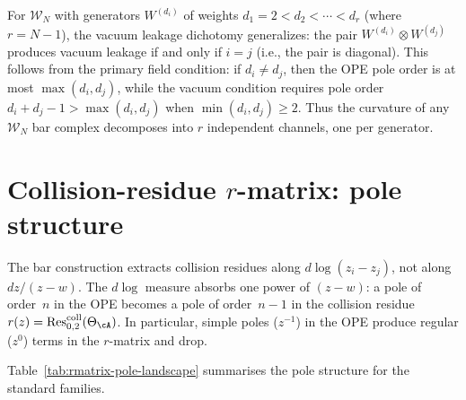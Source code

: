 \begin{remark}\label{rem:wn-vacuum-channels}
For $\mathcal{W}_N$ with generators $W^{(d_i)}$ of weights $d_1 = 2 < d_2 < \cdots < d_r$
(where $r = N-1$), the vacuum leakage dichotomy generalizes: the pair
$W^{(d_i)} \otimes W^{(d_j)}$ produces vacuum leakage if and only if
$i = j$ (i.e., the pair is diagonal).
This follows from the primary field condition: if $d_i \neq d_j$,
then the OPE pole order is at most $\max(d_i, d_j)$, while the vacuum
condition requires pole order $d_i + d_j - 1 > \max(d_i, d_j)$ when
$\min(d_i, d_j) \geq 2$. Thus the curvature of any $\mathcal{W}_N$
bar complex decomposes into $r$ independent channels, one per generator.
\end{remark}



\section{Collision-residue \texorpdfstring{$r$}{r}-matrix: pole structure}
\label{sec:rmatrix-pole-structure}

The bar construction extracts collision residues along
$d\log(z_i - z_j)$, not along $dz/(z-w)$. The $d\log$ measure absorbs
one power of $(z-w)$: a pole of order~$n$ in the OPE becomes a pole of
order~$n-1$ in the collision residue $r(z) = \operatorname{Res}^{\mathrm{coll}}_{0,2}(\Theta_\cA)$.
In particular, simple poles ($z^{-1}$) in the OPE produce
regular ($z^0$) terms in the $r$-matrix and drop.

Table~\ref{tab:rmatrix-pole-landscape} summarises the pole structure
for the standard families.

